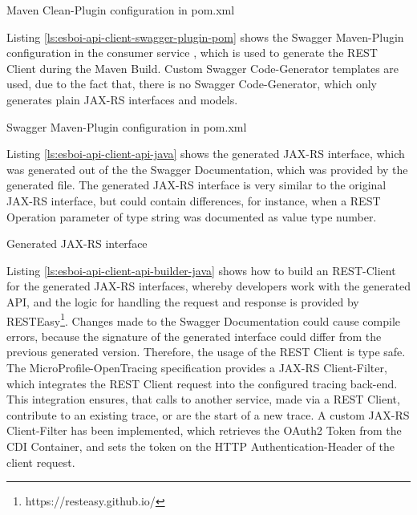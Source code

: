 \begin{listing}[h]
	\caption{Maven Clean-Plugin configuration in pom.xml}
	\label{ls:esboi-api-client-clean-pom}
\end{listing}

Listing \vref{ls:esboi-api-client-swagger-plugin-pom} shows the Swagger Maven-Plugin configuration in the consumer service , which is used to generate the REST Client during the Maven Build. Custom Swagger Code-Generator templates are used, due to the fact that, there is no Swagger Code-Generator, which only generates plain JAX-RS interfaces and models. 

\begin{listing}[h]
	\caption{Swagger Maven-Plugin configuration in pom.xml}
	\label{ls:esboi-api-client-swagger-plugin-pom}
\end{listing}

Listing \vref{ls:esboi-api-client-api-java} shows the generated JAX-RS interface, which was generated out of the the Swagger Documentation, which was provided by the generated  file. The generated JAX-RS interface is very similar to the original JAX-RS interface, but could contain differences, for instance, when a REST Operation parameter of type string was documented as value type number.

\begin{listing}[h]
	\caption{Generated JAX-RS interface}
	\label{ls:esboi-api-client-api-java}
\end{listing}

Listing \vref{ls:esboi-api-client-api-builder-java} shows how to build an REST-Client for the generated JAX-RS interfaces, whereby developers work with the generated API, and the logic for handling the request and response is provided by RESTEasy\footnote{https://resteasy.github.io/}. Changes made to the Swagger Documentation could cause compile errors, because the signature of the generated interface could differ from the previous generated version. Therefore, the usage of the REST Client is type safe. The MicroProfile-OpenTracing specification provides a JAX-RS Client-Filter, which integrates the REST Client request into the configured tracing back-end. This integration ensures, that calls to another service, made via a REST Client, contribute to an existing trace, or are the start of a new trace. A custom JAX-RS Client-Filter has been implemented, which retrieves the OAuth2 Token from the CDI Container, and sets the token on the HTTP Authentication-Header of the client request.

